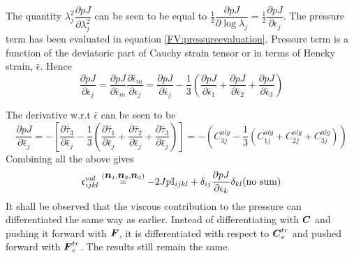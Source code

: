 \documentclass[11pt,twoside,TimesRoman]{article}
\newcommand{\parder}[2]{{\dfrac{\partial #1}{\partial #2}}}
\begin{document}
The quantity $\lambda_j^2\parder{pJ}{\lambda_j^2}$ can be seen to be equal to $\frac{1}{2} \parder{pJ}{\log\lambda_j} = \frac{1}{2} \parder{pJ}{\epsilon_j}$. The pressure term has been evaluated in equation \ref{FV:pressureevaluation}. Pressure term is a function of the deviatoric part of Cauchy strain tensor or in terms of Hencky strain, $\bar{\epsilon}$. Hence
\begin{equation}
	\parder{pJ}{\epsilon_j} = \parder{pJ}{\bar{\epsilon}_m} \parder{\bar{\epsilon}_m}{\epsilon_j}=\parder{pJ}{\bar{\epsilon}_j}-\frac{1}{3}\left(\parder{pJ}{\bar{\epsilon}_1}+\parder{pJ}{\bar{\epsilon}_2}+\parder{pJ}{\bar{\epsilon}_3}\right)
\end{equation}

The derivative w.r.t $\bar{\epsilon}$ can be seen to be 
\begin{equation}
	 \parder{pJ}{\bar{\epsilon}_j} = -\left[ \parder{\bar{\tau}_{3}}{\bar{\epsilon}_j}  -\frac{1}{3}\left( \parder{\bar{\tau}_{1}}{\bar{\epsilon}_j} +\parder{\bar{\tau}_{2}}{\bar{\epsilon}_j}+\parder{\bar{\tau}_{3}}{\bar{\epsilon}_j} \right)  \right] = -\left( C^{alg}_{3j} - \frac{1}{3} (C^{alg}_{1j} + C^{alg}_{2j} + C^{alg}_{3j})  \right)
\end{equation}
Combining all the above gives
\begin{equation}
	\mathfrak{c}^{vol}_{ijkl} \stackrel{(\bfn_1,\bfn_2,\bfn_3) }{=} -2Jp \mathbb{I}_{ijkl}+  \delta_{ij} \parder{pJ}{\epsilon_k}\delta_{kl} (\text{no sum})
\end{equation}
It shall be observed that the viscous contribution to the pressure can differentiated the same way as earlier. Instead of differentiating with $\mbox{\boldmath $C$}$ and pushing it forward with $\mbox{\boldmath $F$}$, it is differentiated with respect to $\mbox{\boldmath $C$}_e^{tr}$ and pushed forward with $\mbox{\boldmath $F$}_e^{tr}$. The results still remain the same.
\end{document}
